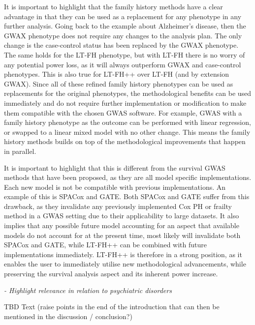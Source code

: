 It is important to highlight that the family history methods have a clear advantage in that they can be used as a replacement for any phenotype in any further analysis. Going back to the example about Alzheimer's disease, then the GWAX phenotype does not require any changes to the analysis plan. The only change is the case-control status has been replaced by the GWAX phenotype. The same holds for the LT-FH phenotype, but with LT-FH there is no worry of any potential power loss, as it will always outperform GWAX and case-control phenotypes. This is also true for LT-FH++ over LT-FH (and by extension GWAX). Since all of these refined family history phenotypes can be used as replacements for the original phenotypes, the methodological benefits can be used immediately and do not require further implementation or modification to make them compatible with the chosen GWAS software. For example, GWAS with a family history phenotype as the outcome can be performed with linear regression, or swapped to a linear mixed model with no other change. This means the family history methods builds on top of the methodological improvements that happen in parallel.

It is important to highlight that this is different from the survival GWAS methods that have been proposed, as they are all model specific implementations. Each new model is not be compatible with previous implementations. An example of this is SPACox and GATE. Both SPACox and GATE suffer from this drawback, as they invalidate any previously implemented Cox PH or frailty method in a GWAS setting due to their applicability to large datasets. It also implies that any possible future model accounting for an aspect that available models do not account for at the present time, most likely will invalidate both SPACox and GATE, while LT-FH++ can be combined with future implementations immediately. LT-FH++ is therefore in a strong position, as it enables the user to immediately utilise new methodological advancements, while preserving the survival analysis aspect and its inherent power increase.    

{\itshape
- Highlight relevance in relation to psychiatric disorders
}

TBD Text (raise points in the end of the introduction that can then be mentioned in the discussion / conclusion?)